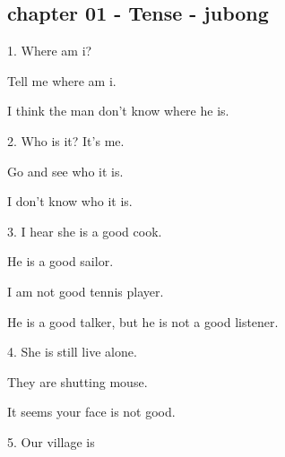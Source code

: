 \subsection{chapter 01 - Tense - jubong}\label{chapter01-jubong}

1. Where am i?

Tell me where am i.

I think the man don't know where he is.
\vspace{1pc}

2. Who is it? It's me.

Go and see who it is.

I don't know who it is.
\vspace{1pc}

3. I hear she is a good cook.

He is a good sailor.

I am not good tennis player.

He is a good talker, but he is not a good listener.
\vspace{1pc}

4. She is still live alone.

They are shutting mouse.

It seems your face is not good.
\vspace{1pc}

5. Our village is